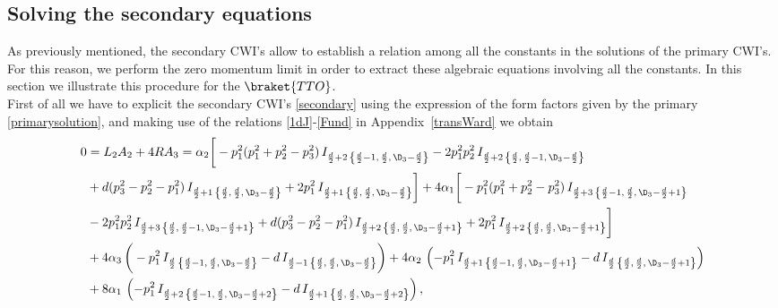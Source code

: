 \documentclass[a4paper,11pt,openright,twoside]{book}
\let\a=\alpha   \let\b=\beta   \let\g=\gamma   \let\d=\delta
\newcommand{\appref}[1]{Appendix~\ref{#1}}		%
\numberwithin{equation}{section}
\begin{document}
{{{\subsection{Solving the secondary equations}
As previously mentioned, the secondary CWI's allow to establish a relation among all the constants in the solutions of the primary CWI's. For this reason, we perform the zero momentum limit in order to extract these algebraic equations involving all the constants. In this section we illustrate this procedure for the $\braket{TTO}$. \\
First of all we have to explicit the secondary CWI's \eqref{secondary} using the expression of the form factors given by the primary \eqref{primarysolution}, and making use of the relations \eqref{1dJ}-\eqref{Fund} in \appref{transWard} we obtain
\begin{align}
	0&=L_2A_2+4RA_3=\a_2\bigg[-p_1^2(p_1^2+p_2^2-p_3^2)\,I_{\frac{d}{2}+2\,\left\{\frac{d}{2}-1,\,\frac{d}{2},\,\D_3-\frac{d}{2}\right\}}-2p_1^2p_2^2\,I_{\frac{d}{2}+2\,\left\{\frac{d}{2},\,\frac{d}{2}-1,\,\D_3-\frac{d}{2}\right\}}\notag\\
	&+d(p_3^2-p_2^2-p_1^2)\,I_{\frac{d}{2}+1\,\left\{\frac{d}{2},\,\frac{d}{2},\,\D_3-\frac{d}{2}\right\}}+2p_1^2\,I_{\frac{d}{2}+1\,\left\{\frac{d}{2},\,\frac{d}{2},\,\D_3-\frac{d}{2}\right\}}\bigg]
	+4\a_1\bigg[-p_1^2(p_1^2+p_2^2-p_3^2)\,I_{\frac{d}{2}+3\,\left\{\frac{d}{2}-1,\,\frac{d}{2},\,\D_3-\frac{d}{2}+1\right\}}\notag\\
	&-2p_1^2p_2^2\,I_{\frac{d}{2}+3\,\left\{\frac{d}{2},\,\frac{d}{2}-1,\,\D_3-\frac{d}{2}+1\right\}}+d(p_3^2-p_2^2-p_1^2)\,I_{\frac{d}{2}+2\,\left\{\frac{d}{2},\,\frac{d}{2},\,\D_3-\frac{d}{2}+1\right\}}+2p_1^2\,I_{\frac{d}{2}+2\,\left\{\frac{d}{2},\,\frac{d}{2},\,\D_3-\frac{d}{2}+1\right\}}\bigg]\notag\\
	&+4\a_3\,\bigg(-p_1^2\,I_{\frac{d}{2}\,\left\{\frac{d}{2}-1,\,\frac{d}{2},\,\D_3-\frac{d}{2}\right\}}-d\,I_{\frac{d}{2}-1\,\left\{\frac{d}{2},\,\frac{d}{2},\,\D_3-\frac{d}{2}\right\}}\bigg)+4\a_2\,\left(-p_1^2\,I_{\frac{d}{2}+1\,\left\{\frac{d}{2}-1,\,\frac{d}{2},\,\D_3-\frac{d}{2}+1\right\}}-d\,I_{\frac{d}{2}\,\left\{\frac{d}{2},\,\frac{d}{2},\,\D_3-\frac{d}{2}+1\right\}}\right)\notag\\
	&+8\a_1\,\left(-p_1^2\,I_{\frac{d}{2}+2\,\left\{\frac{d}{2}-1,\,\frac{d}{2},\,\D_3-\frac{d}{2}+2\right\}}-d\,I_{\frac{d}{2}+1\,\left\{\frac{d}{2},\,\frac{d}{2},\,\D_3-\frac{d}{2}+2\right\}}\right),\label{firstsecondary}
\end{align}
}}}
\end{document}
